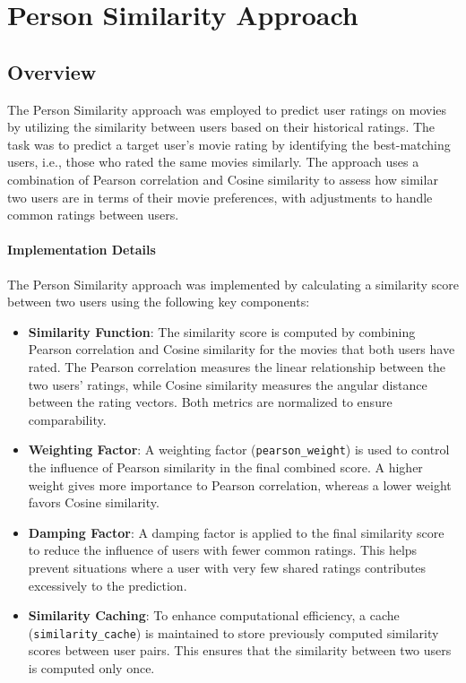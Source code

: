 \documentclass[a4paper,10pt]{article}
\begin{document}
\section{Person Similarity Approach}
\subsection{Overview}
The Person Similarity approach was employed to predict user ratings on movies by utilizing the similarity between users based on their historical ratings. The task was to predict a target user's movie rating by identifying the best-matching users, i.e., those who rated the same movies similarly. The approach uses a combination of Pearson correlation and Cosine similarity to assess how similar two users are in terms of their movie preferences, with adjustments to handle common ratings between users.

\paragraph{Implementation Details}
The Person Similarity approach was implemented by calculating a similarity score between two users using the following key components:

\begin{itemize}
    \item \textbf{Similarity Function}: The similarity score is computed by combining Pearson correlation and Cosine similarity for the movies that both users have rated. The Pearson correlation measures the linear relationship between the two users' ratings, while Cosine similarity measures the angular distance between the rating vectors. Both metrics are normalized to ensure comparability.

    \item \textbf{Weighting Factor}: A weighting factor (\texttt{pearson\_weight}) is used to control the influence of Pearson similarity in the final combined score. A higher weight gives more importance to Pearson correlation, whereas a lower weight favors Cosine similarity.

    \item \textbf{Damping Factor}: A damping factor is applied to the final similarity score to reduce the influence of users with fewer common ratings. This helps prevent situations where a user with very few shared ratings contributes excessively to the prediction.

    \item \textbf{Similarity Caching}: To enhance computational efficiency, a cache (\texttt{similarity\_cache}) is maintained to store previously computed similarity scores between user pairs. This ensures that the similarity between two users is computed only once.
\end{itemize}
\end{document}
